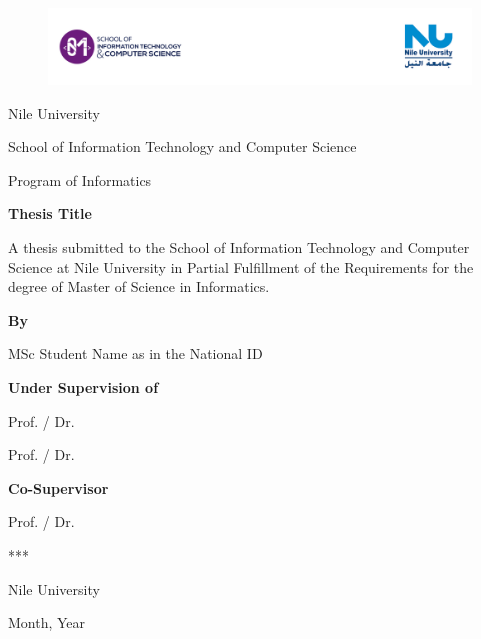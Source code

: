 \documentclass[ms]{osudissert96}
\begin{document}
\thispagestyle{empty}

\begin{figure}
    \centering
    \includegraphics[width=1\linewidth]{images/header_logo.png}
\end{figure}
\begin{center}

Nile University

School of Information Technology and Computer Science

Program of Informatics

\vspace{\baselineskip}
{\Large \textbf{Thesis Title}}

\vspace{\baselineskip}
A thesis submitted to the School of Information Technology and Computer Science at Nile University in Partial Fulfillment of the Requirements for the degree of Master of Science in Informatics.

\textbf{By} 

MSc Student Name as in the National ID

\textbf{Under Supervision of}

Prof. / Dr.

Prof. / Dr. 

\textbf{Co-Supervisor}

Prof. / Dr. 

***

Nile University 

Month, Year 
\end{center}


\pagebreak


\end{document}
